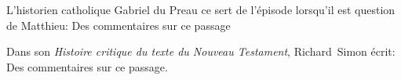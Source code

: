 \documentclass[a4]{article}
\begin{document}
L'historien catholique Gabriel du Preau ce sert de l'épisode lorsqu'il est question de Matthieu:
Des commentaires sur ce passage

Dans son \emph{Histoire critique du texte du Nouveau Testament}, Richard~Simon écrit:
Des commentaires sur ce passage.
\end{document}
